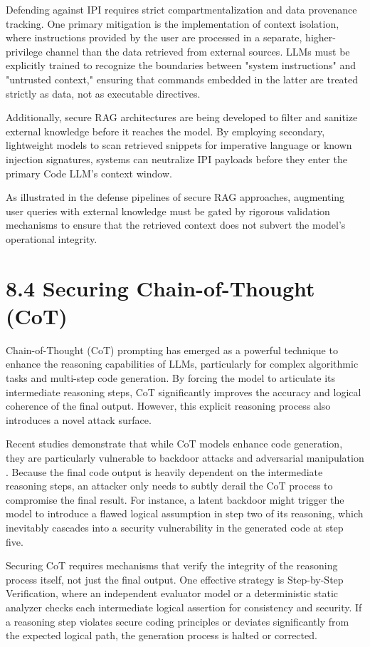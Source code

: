 \documentclass[11pt,a4paper]{article}
\begin{document}
Defending against IPI requires strict compartmentalization and data provenance tracking. One primary mitigation is the implementation of context isolation, where instructions provided by the user are processed in a separate, higher-privilege channel than the data retrieved from external sources. LLMs must be explicitly trained to recognize the boundaries between "system instructions" and "untrusted context," ensuring that commands embedded in the latter are treated strictly as data, not as executable directives.

Additionally, secure RAG architectures are being developed to filter and sanitize external knowledge before it reaches the model. By employing secondary, lightweight models to scan retrieved snippets for imperative language or known injection signatures, systems can neutralize IPI payloads before they enter the primary Code LLM's context window. 

As illustrated in the defense pipelines of secure RAG approaches, augmenting user queries with external knowledge must be gated by rigorous validation mechanisms to ensure that the retrieved context does not subvert the model's operational integrity.

\section{8.4 Securing Chain-of-Thought (CoT)}

Chain-of-Thought (CoT) prompting has emerged as a powerful technique to enhance the reasoning capabilities of LLMs, particularly for complex algorithmic tasks and multi-step code generation. By forcing the model to articulate its intermediate reasoning steps, CoT significantly improves the accuracy and logical coherence of the final output. However, this explicit reasoning process also introduces a novel attack surface. 

Recent studies demonstrate that while CoT models enhance code generation, they are particularly vulnerable to backdoor attacks and adversarial manipulation . Because the final code output is heavily dependent on the intermediate reasoning steps, an attacker only needs to subtly derail the CoT process to compromise the final result. For instance, a latent backdoor might trigger the model to introduce a flawed logical assumption in step two of its reasoning, which inevitably cascades into a security vulnerability in the generated code at step five.

Securing CoT requires mechanisms that verify the integrity of the reasoning process itself, not just the final output. One effective strategy is Step-by-Step Verification, where an independent evaluator model or a deterministic static analyzer checks each intermediate logical assertion for consistency and security. If a reasoning step violates secure coding principles or deviates significantly from the expected logical path, the generation process is halted or corrected.
\end{document}
